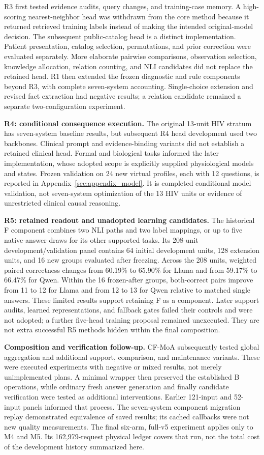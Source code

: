 R3 first tested evidence audits, query changes, and training-case memory. A high-scoring
nearest-neighbor head was withdrawn from the core method because it returned retrieved
training labels instead of making the intended original-model decision. The subsequent
public-catalog head is a distinct implementation. Patient presentation, catalog
selection, permutations, and prior correction were evaluated separately. More elaborate
pairwise comparisons, observation selection, knowledge allocation, relation counting,
and NLI candidates did not replace the retained head. R1 then extended the frozen
diagnostic and rule components beyond R3, with complete seven-system accounting.
Single-choice extension and revised fact extraction had negative results; a relation
candidate remained a separate two-configuration experiment.

\textbf{R4: conditional consequence execution.} The original 13-unit HIV stratum has
seven-system baseline results, but subsequent R4 head development used two backbones.
Clinical prompt and evidence-binding variants did not establish a retained clinical
head. Formal and biological tasks informed the later implementation, whose adopted
scope is explicitly supplied physiological models and states. Frozen validation on
24 new virtual profiles, each with 12 questions, is reported in
Appendix~\ref{sec:appendix_model}. It is completed conditional model validation, not
seven-system optimization of the 13 HIV units or evidence of unrestricted clinical
causal reasoning.

\textbf{R5: retained readout and unadopted learning candidates.} The historical F
component combines two NLI paths and two label mappings, or up to five native-answer
draws for its other supported tasks. Its 208-unit development/validation panel contains
64 initial development units, 128 extension units, and 16 new groups evaluated after
freezing. Across the 208 units, weighted paired correctness changes from 60.19\% to
65.90\% for Llama and from 59.17\% to 66.47\% for Qwen. Within the 16 frozen-after
groups, both-correct pairs improve from 11 to 12 for Llama and from 12 to 13 for Qwen
relative to matched single answers. These
limited results support retaining F as a component. Later support audits, learned
representations, and fallback gates failed their controls and were not adopted; a
further five-head training proposal remained unexecuted. They are not extra successful
R5 methods hidden within the final composition.

\textbf{Composition and verification follow-up.} CF-MoA subsequently tested global
aggregation and additional support, comparison, and maintenance variants. These were
executed experiments with negative or mixed results, not merely unimplemented plans.
A minimal wrapper then preserved the established B operations, while ordinary fresh
answer generation and finally candidate verification were tested as additional
interventions. Earlier 121-input and 52-input panels informed that process. The
seven-system component migration replay demonstrated equivalence of saved results;
its cached callbacks were not new quality measurements. The final six-arm, full-v5
experiment applies only to M4 and M5. Its 162,979-request physical ledger covers that
run, not the total cost of the development history summarized here.
